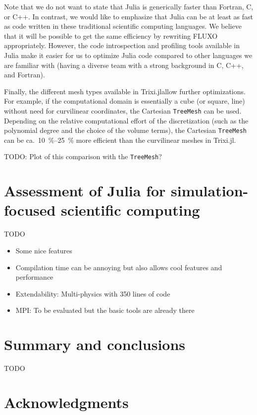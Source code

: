 \documentclass{juliacon}
\newcommand{\trixi}{Trixi.jl}
\begin{document}
Note that we do not want to state that Julia is generically faster than Fortran,
C, or C++. In contrast, we would like to emphasize that Julia can be at least
as fast as code written in these traditional scientific computing languages.
We believe that it will be possible to get the same efficiency by rewriting
FLUXO appropriately. However, the code introspection and profiling tools available
in Julia make it easier for us to optimize Julia code compared to other languages
we are familiar with (having a diverse team with a strong background in C, C++,
and Fortran).

Finally, the different mesh types available in \trixi allow further optimizations.
For example, if the computational domain is essentially a cube (or square, line)
without need for curvilinear coordinates, the Cartesian \lstinline{TreeMesh} can
be used. Depending on the relative computational effort of the discretization
(such as the polynomial degree and the choice of the volume terms), the
Cartesian \lstinline{TreeMesh} can be ca.\ \SI{10}{\percent}--\SI{25}{\percent}
more efficient than the curvilinear meshes in \trixi.

TODO: Plot of this comparison with the \lstinline{TreeMesh}?



\section{Assessment of Julia for simulation-focused scientific computing}

TODO %
\begin{itemize}
  \item Some nice features
  \item Compilation time can be annoying but also allows cool features and performance
  \item Extendability: Multi-physics with 350 lines of code \cite{schlottkelakemper2021purely}
  \item MPI: To be evaluated but the basic tools are already there \cite{byrne2021mpi}
\end{itemize}



\section{Summary and conclusions}

TODO %



\section*{Acknowledgments}
\end{document}
